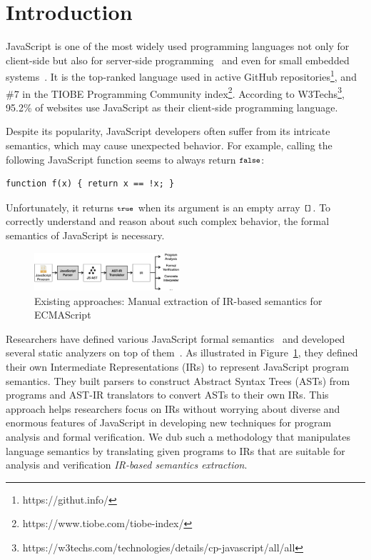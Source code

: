 \section{Introduction}
JavaScript is one of the most widely used programming languages not only for client-side
but also for server-side programming~\cite{nodejs, meanjs}
and even for small embedded systems~\cite{espruino, tessel2}.
It is the top-ranked language used in active GitHub
repositories\footnote{https://githut.info/}, and \#7 in the TIOBE
Programming Community index\footnote{https://www.tiobe.com/tiobe-index/}.
According to W3Techs\footnote{https://w3techs.com/technologies/details/cp-javascript/all/all},
95.2\% of websites use JavaScript as their client-side programming language.

Despite its popularity, JavaScript developers often suffer from its intricate semantics,
which may cause unexpected behavior.  For example, calling the following JavaScript
function seems to always return \( \texttt{\footnotesize false} \):
\begin{lstlisting}[style=myJSstyle]
    function f(x) { return x == !x; }
\end{lstlisting}
Unfortunately, it returns \( \texttt{\footnotesize true} \) when its argument is an empty array
\( \texttt{\footnotesize[]} \).  To correctly understand and reason about such complex
behavior, the formal semantics of JavaScript is necessary.

\begin{figure}
  \centering
  \includegraphics[width=0.48\textwidth]{img/existing.png}
\vspace*{-2em}
  \caption{Existing approaches: Manual extraction of IR-based semantics for ECMAScript}
  \label{fig:existing}
\vspace*{-1em}
\end{figure}

Researchers have defined various JavaScript formal
semantics~\cite{aplas08,lambdajs,kjs,javert} and developed several static
analyzers on top of them~\cite{jsai,tajs,wala,safe}.  As illustrated
in Figure~\ref{fig:existing}, they defined their own Intermediate
Representations (IRs) to represent JavaScript program semantics.  They
built parsers to construct Abstract Syntax Trees (ASTs) from
programs and AST-IR translators to convert ASTs
to their own IRs.  This approach helps researchers focus on IRs
without worrying about diverse and enormous features of JavaScript in
developing new techniques for program analysis and formal verification.
We dub such a methodology that manipulates language semantics by
translating given programs to IRs that are suitable for analysis and
verification \textit{IR-based semantics extraction}.

